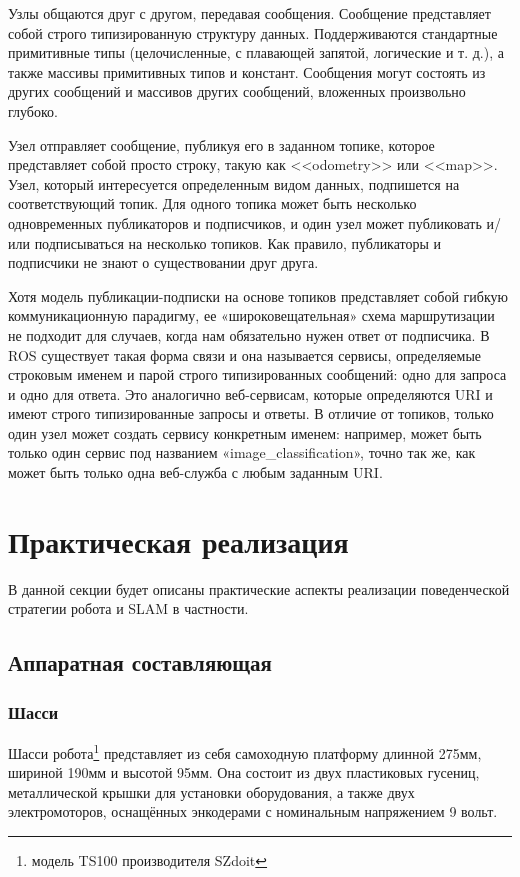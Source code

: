 \documentclass[12pt,a4paper]{scrartcl}
\begin{document}
					Узлы общаются друг с другом, передавая сообщения. Сообщение представляет собой строго типизированную структуру данных. Поддерживаются стандартные примитивные типы (целочисленные, с плавающей запятой, логические и т. д.), а также массивы примитивных типов и констант. Сообщения могут состоять из других сообщений и массивов других сообщений, вложенных произвольно глубоко.
					
					Узел отправляет сообщение, публикуя его в заданном топике, которое представляет собой просто строку, такую как <<odometry>> или <<map>>. Узел, который интересуется определенным видом данных, подпишется на соответствующий топик. Для одного топика может быть несколько одновременных публикаторов и подписчиков, и один узел может публиковать и/или подписываться на несколько топиков. Как правило, публикаторы и подписчики не знают о существовании друг друга.
					
					Хотя модель публикации-подписки на основе топиков представляет собой гибкую коммуникационную парадигму, ее «широковещательная» схема маршрутизации не подходит для случаев, когда нам обязательно нужен ответ от подписчика. В ROS существует такая форма связи и она называется сервисы, определяемые строковым именем и парой строго типизированных сообщений: одно для запроса и одно для ответа. Это аналогично веб-сервисам, которые определяются URI и имеют строго типизированные запросы и ответы. В отличие от топиков, только один узел может создать сервису конкретным именем: например, может быть только один сервис под названием «image\_classification», точно так же, как может быть только одна веб-служба с любым заданным URI.
			
		\section{Практическая реализация} \label{sec:practice}
		
			В данной секции будет описаны практические аспекты реализации поведенческой стратегии робота и SLAM в частности.
			\subsection{Аппаратная составляющая}
				\subsubsection{Шасси}
					Шасси робота\footnote{модель TS100 производителя SZdoit} представляет из себя самоходную платформу длинной 275мм, шириной 190мм и высотой 95мм. Она состоит из двух пластиковых гусениц, металлической крышки для установки оборудования, а также двух электромоторов, оснащённых энкодерами с номинальным напряжением 9 вольт\cite{bib:TS100Desc}.
\end{document}
